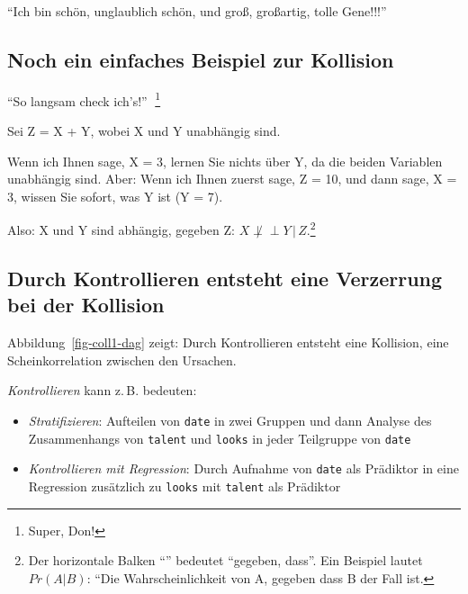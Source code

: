 \documentclass[
  ngerman,
  letterpaper,
  twoside,
  open=any]{scrbook}
\providecommand{\tightlist}{%
  \setlength{\itemsep}{0pt}\setlength{\parskip}{0pt}}\usepackage{longtable,booktabs,array}
\theoremstyle{definition}
\theoremstyle{plain}
\theoremstyle{definition}
\theoremstyle{definition}
\theoremstyle{definition}
\theoremstyle{definition}
\theoremstyle{remark}
\begin{document}
\begin{displayquote}
\enquote{Ich bin schön, unglaublich schön, und groß, großartig, tolle
Gene!!!} 🧑
\end{displayquote}

\subsection{Noch ein einfaches Beispiel zur
Kollision}\label{noch-ein-einfaches-beispiel-zur-kollision}

\begin{displayquote}
\enquote{So langsam check ich's!} 🧑\footnote{Super, Don!}
\end{displayquote}

Sei Z = X + Y, wobei X und Y unabhängig sind.

Wenn ich Ihnen sage, X = 3, lernen Sie nichts über Y, da die beiden
Variablen unabhängig sind. Aber: Wenn ich Ihnen zuerst sage, Z = 10, und
dann sage, X = 3, wissen Sie sofort, was Y ist (Y = 7).

Also: X und Y sind abhängig, gegeben Z:
\(X \not\perp \!\!\! \perp Y \,|\, Z\).\footnote{Der horizontale Balken
  \enquote{\textbar{}} bedeutet \enquote{gegeben, dass}. Ein Beispiel
  lautet \(Pr(A|B)\): ``Die Wahrscheinlichkeit von A, gegeben dass B der
  Fall ist.}

\subsection{Durch Kontrollieren entsteht eine Verzerrung bei der
Kollision}\label{durch-kontrollieren-entsteht-eine-verzerrung-bei-der-kollision}

Abbildung~\ref{fig-coll1-dag} zeigt: Durch Kontrollieren entsteht eine
Kollision, eine Scheinkorrelation zwischen den Ursachen.

\emph{Kontrollieren} kann z.\,B. bedeuten:

\begin{itemize}
\tightlist
\item
  \emph{Stratifizieren}: Aufteilen von \texttt{date} in zwei Gruppen und
  dann Analyse des Zusammenhangs von \texttt{talent} und \texttt{looks}
  in jeder Teilgruppe von \texttt{date}
\item
  \emph{Kontrollieren mit Regression}: Durch Aufnahme von \texttt{date}
  als Prädiktor in eine Regression zusätzlich zu \texttt{looks} mit
  \texttt{talent} als Prädiktor
\end{itemize}
\end{document}
